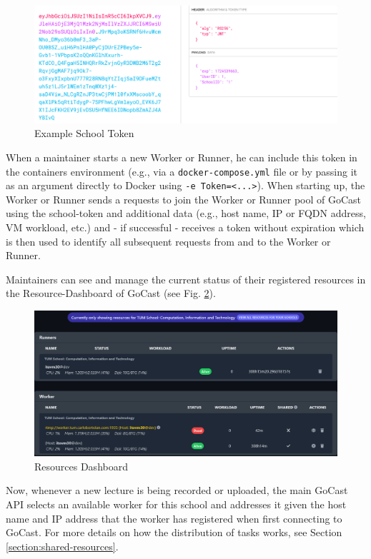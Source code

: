 \begin{figure}[htpb]
    \centering
    \includegraphics[width=390pt]{images/SchoolToken.png}
    \caption[Example School Token]{Example School Token}\label{fig:school-token}
\end{figure}

When a maintainer starts a new Worker or Runner, he can include this token in the containers environment (e.g., via a \texttt{docker-compose.yml} file or by passing it as an argument directly to Docker using \texttt{-e Token=<...>}). When starting up, the Worker or Runner sends a requests to join the Worker or Runner pool of GoCast using the school-token and additional data (e.g., host name, IP or FQDN address, VM workload, etc.) and - if successful - receives a token without expiration which is then used to identify all subsequent requests from and to the Worker or Runner.  

Maintainers can see and manage the current status of their registered resources in the Resource-Dashboard of GoCast (see Fig. \ref{fig:resource-dashboard}).

\begin{figure}[htpb]
    \centering
    \includegraphics[width=390pt]{images/ResourceDashboard.png}
    \caption[Resources Dashboard]{Resources Dashboard}\label{fig:resource-dashboard}
\end{figure}

Now, whenever a new lecture is being recorded or uploaded, the main GoCast \ac{API} selects an available worker for this school and addresses it given the host name and IP address that the worker has registered when first connecting to GoCast. For more details on how the distribution of tasks works, see Section \ref{section:shared-resources}.

